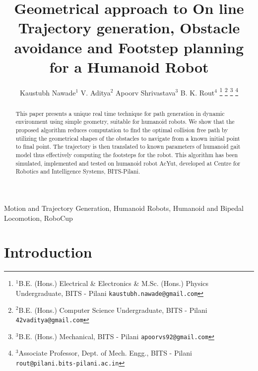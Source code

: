 \documentclass[letterpaper, 10 pt, conference]{ieeeconf}  %
\title{\LARGE \bf
Geometrical approach to On line Trajectory generation, Obstacle avoidance and Footstep planning for a Humanoid Robot
}
\author{ Kaustubh Nawade$^{1}$ V. Aditya$^{2}$ Apoorv Shrivastava$^{3}$ B. K. Rout$^{4}$%
\thanks{$^{1}$B.E. (Hons.) Electrical \& Electronics \& M.Sc. (Hons.) Physics Undergraduate, BITS - Pilani
        {\tt\small kaustubh.nawade@gmail.com}}%
\thanks{$^{2}$B.E. (Hons.) Computer Science Undergraduate, BITS - Pilani
        {\tt\small 42vaditya@gmail.com}}%
\thanks{$^{3}$B.E. (Hons.) Mechanical, BITS - Pilani
        {\tt\small apoorvs92@gmail.com}}%
\thanks{$^{3}$Associate Professor, Dept. of Mech. Engg., BITS - Pilani
        {\tt\small rout@pilani.bits-pilani.ac.in}}%
}
\begin{document}
\maketitle
\thispagestyle{empty}
\pagestyle{empty}


\begin{abstract}

This paper presents a unique real time technique for  path generation in dynamic environment using simple geometry, suitable for humanoid robots. We show that the proposed algorithm reduces computation to find the optimal collision free path by utilizing the geometrical shapes of the obstacles  to navigate from a known initial point to final point. The trajectory is then translated to known parameters of humanoid gait model thus effectively computing the footsteps for the robot. This algorithm has been simulated, implemented and tested on humanoid robot AcYut, developed at Centre for Robotics and Intelligence Systems, BITS-Pilani.\\
\end{abstract}

\begin{keywords}
Motion and Trajectory Generation, Humanoid Robots, Humanoid and Bipedal Locomotion, RoboCup
\end{keywords}


\section{Introduction}
\end{document}
